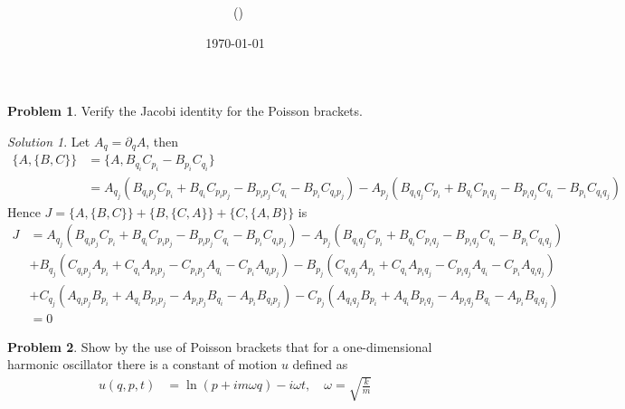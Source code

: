 \documentclass[twoside,11pt]{article}
\title{{\lms \Code \ \Ass}}
\author{\lms \name \ (\href{mailto:\mail}{\mail})}
\date{\sffamily \today}
\makeatletter
\newcommand{\lms}{\fontfamily{lmss}\selectfont} %
\theoremstyle{definition}
\newtheorem{problem}{\lms Problem}
\theoremstyle{remark}
\newtheorem*{solution}{Solution}
\renewcommand{\maketitle}{\bgroup\setlength{\parindent}{0pt}
\begin{flushleft}
  \textbf{\Large\@title}

  \@author
\end{flushleft}\egroup
}
\makeatother
\begin{document}
\maketitle
\thispagestyle{title}

\begin{problem}
Verify the Jacobi identity for the Poisson brackets.
\end{problem}

\begin{solution} 
Let $A_q = \partial_q A$, then
\begin{align*}
    \{A, \{B, C\}\} 
    &= \{A, B_{q_i}C_{p_i} - B_{p_i}C_{q_i}\}\\
    &= 
    A_{q_j}(B_{q_ip_j}C_{p_i} + B_{q_i}C_{p_ip_j} - B_{p_ip_j}C_{q_i}
    - B_{p_i}C_{q_ip_j})
    -A_{p_j}(B_{q_iq_j}C_{p_i} + B_{q_i}C_{p_iq_j} - B_{p_iq_j}C_{q_i}
    - B_{p_i}C_{q_iq_j})
\end{align*}
Hence $J=\{A, \{B, C\}\} + \{B, \{C, A\}\} + \{C, \{A, B\}\}$ is
\begin{align*}
    J &= 
    A_{q_j}(B_{q_ip_j}C_{p_i} + B_{q_i}C_{p_ip_j} - B_{p_ip_j}C_{q_i}
    - B_{p_i}C_{q_ip_j})
    -A_{p_j}(B_{q_iq_j}C_{p_i} + B_{q_i}C_{p_iq_j} - B_{p_iq_j}C_{q_i}
    - B_{p_i}C_{q_iq_j})\\
      &+
    B_{q_j}(C_{q_ip_j}A_{p_i} + C_{q_i}A_{p_ip_j} - C_{p_ip_j}A_{q_i}
    - C_{p_i}A_{q_ip_j})
    -B_{p_j}(C_{q_iq_j}A_{p_i} + C_{q_i}A_{p_iq_j} - C_{p_iq_j}A_{q_i}
    - C_{p_i}A_{q_iq_j})\\
      &+
    C_{q_j}(A_{q_ip_j}B_{p_i} + A_{q_i}B_{p_ip_j} - A_{p_ip_j}B_{q_i}
    - A_{p_i}B_{q_ip_j})
    -C_{p_j}(A_{q_iq_j}B_{p_i} + A_{q_i}B_{p_iq_j} - A_{p_iq_j}B_{q_i}
    - A_{p_i}B_{q_iq_j})\\
      &= 0
\end{align*}
\end{solution}




\begin{problem}
Show by the use of Poisson brackets that for a one-dimensional harmonic oscillator
there is a constant of motion $u$ defined as
\begin{align}
    u(q,p,t) &= \ln(p + im\omega q) - i\omega t,\quad
    \omega = \sqrt{\frac{k}{m}}
\end{align}
\end{problem}
\end{document}
